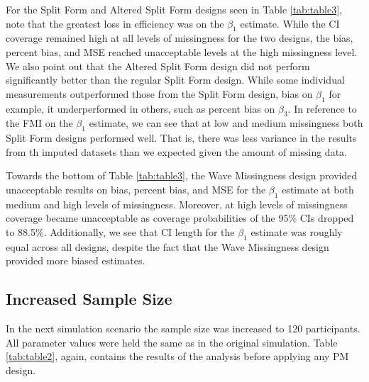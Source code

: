 \documentclass{svjour3}\usepackage[]{graphicx}\usepackage[]{color}
\begin{document}
For the Split Form and Altered Split Form designs seen in Table \ref{tab:table3}, note that the greatest loss in efficiency was on the $\beta_1$ estimate. While the CI coverage remained high at all levels of missingness for the two designs, the bias, percent bias, and MSE reached unacceptable levels at the high missingness level. We also point out that the Altered Split Form design did not perform significantly better than the regular Split Form design. While some individual measurements outperformed those from the Split Form design, bias on $\beta_1$ for example, it underperformed in others, such as percent bias on $\beta_3$. In reference to the FMI on the $\beta_1$ estimate, we can see that at low and medium missingness both Split Form designs performed well. That is, there was less variance in the results from th imputed datasets than we expected given the amount of missing data.\par

Towards the bottom of Table \ref{tab:table3}, the Wave Missingness design provided unacceptable results on bias, percent bias, and MSE for the $\beta_1$ estimate at both medium and high levels of missingness. Moreover, at high levels of missingness coverage became unacceptable as coverage probabilities of the 95\% CIs dropped to 88.5\%.  Additionally, we see that CI length for the $\beta_1$ estimate was roughly equal across all designs, despite the fact that the Wave Missingness design provided more biased estimates. \par

\subsection{Increased Sample Size}
\label{sec:3.2}
In the next simulation scenario the sample size was increased to 120 participants. All parameter values were held the same as in the original simulation. Table \ref{tab:table2}, again, contains the results of the analysis before applying any PM design. \par
\end{document}
